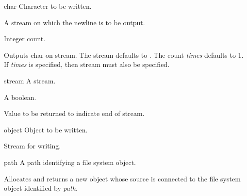 \begin{optDefinition}
\begin{arguments}
    \item[char] Character to be written.
    \item[\optional{stream}] A stream on which the newline is to be output.
    \item[\optional{times}] Integer count.
\end{arguments}
%
\result%
Outputs char on stream. The stream defaults to
. The count {\em times\/} defaults to 1.
%
\remarks%
If {\em times\/} is specified, then stream must also be specified.

\begin{arguments}
    \item[stream] A stream.
    \item[\optional{eos-error-p}] A boolean.
    \item[\optional{eos-value}] Value to be returned to indicate end of stream.
\end{arguments}

\begin{arguments}
    \item[object] Object to be written.
    \item[\optional{stream}] Stream for writing.
\end{arguments}


\begin{arguments}
    \item[path] A path identifying a file system object.
\end{arguments}
%
\result%
Allocates and returns a new  object whose source
is connected to the file system object identified by {\em path}.


\end{optDefinition}
